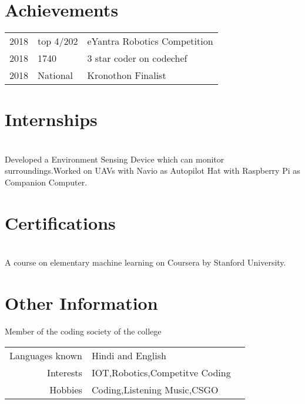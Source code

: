 \documentclass[]{resume-openfont}
\begin{document}
\begin{minipage}[t]{0.66\textwidth}

\section{Achievements} 
\begin{tabular}{rll}
2018	     & top 4/202  & eYantra Robotics Competition\\
2018	     & 1740  & 3 star coder on codechef\\
2018	     & National  & Kronothon Finalist
\end{tabular}
\sectionsep
\section{Internships }

\\
Developed a Environment Sensing Device which can monitor surroundings.Worked on UAVs with Navio as Autopilot Hat with Raspberry Pi as Companion Computer. 
\sectionsep
\section{Certifications }
\\
A course on elementary machine learning on Coursera by Stanford University.
\sectionsep
\section{Other Information }
Member of the coding society of the college\\
\begin{tabular}{rll}
Languages known & Hindi and English\\
Interests & IOT,Robotics,Competitve Coding\\
Hobbies & Coding,Listening Music,CSGO
\end{tabular}
\sectionsep
\end{minipage} 
\end{document}
